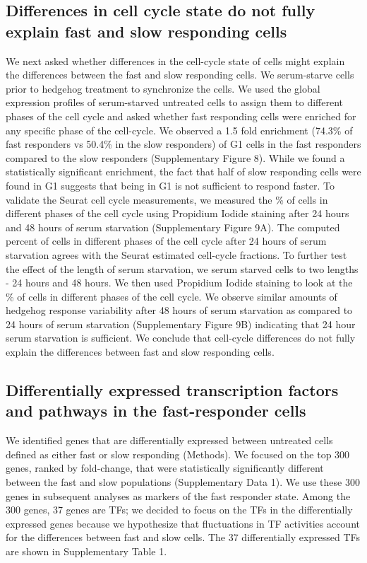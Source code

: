 \subsection{Differences in cell cycle state do not fully explain fast and slow responding cells}

We next asked whether differences in the cell-cycle state of cells might explain the differences between the fast and slow responding cells. We serum-starve cells prior to hedgehog treatment to synchronize the cells. We used the global expression profiles of serum-starved untreated cells to assign them to different phases of the cell cycle and asked whether fast responding cells were enriched for any specific phase of the cell-cycle. We observed a 1.5 fold enrichment (74.3\% of fast responders vs 50.4\% in the slow responders) of G1 cells in the fast responders compared to the slow responders (Supplementary Figure 8). While we found a statistically significant enrichment, the fact that half of slow responding cells were found in G1 suggests that being in G1 is not sufficient to respond faster. To validate the Seurat cell cycle measurements, we measured the \% of cells in different phases of the cell cycle using Propidium Iodide staining after 24 hours and 48 hours of serum starvation (Supplementary Figure 9A). The computed percent of cells in different phases of the cell cycle after 24 hours of serum starvation agrees with the Seurat estimated cell-cycle fractions. To further test the effect of the length of serum starvation, we serum starved cells to two lengths - 24 hours and 48 hours. We then used Propidium Iodide staining to look at the \% of cells in different phases of the cell cycle. We observe similar amounts of hedgehog response variability after 48 hours of serum starvation as compared to 24 hours of serum starvation (Supplementary Figure 9B) indicating that 24 hour serum starvation is sufficient. We conclude that cell-cycle differences do not fully explain the differences between fast and slow responding cells.
\subsection{Differentially expressed transcription factors and pathways in the fast-responder cells}

We identified genes that are differentially expressed between untreated cells defined as either fast or slow responding (Methods). We focused on the top 300 genes, ranked by fold-change, that were statistically significantly different between the fast and slow populations (Supplementary Data 1). We use these 300 genes in subsequent analyses as markers of the fast responder state. Among the 300 genes, 37 genes are TFs; we decided to focus on the TFs in the differentially expressed genes because we hypothesize that fluctuations in TF activities account for the differences between fast and slow cells. The 37 differentially expressed TFs are shown in Supplementary Table 1. 

